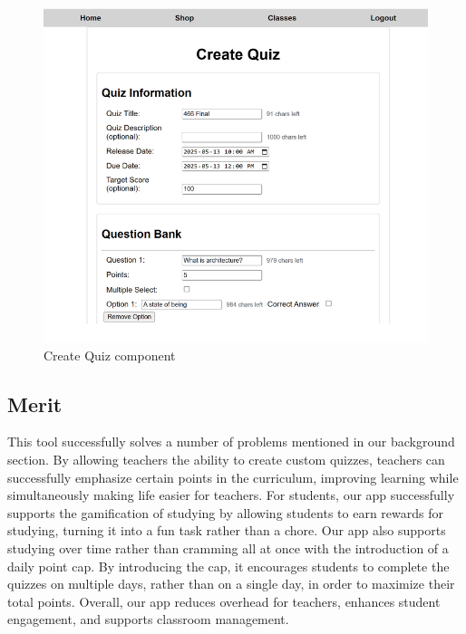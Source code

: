 \begin{enumerate}
\begin{figure}[H]
        \includegraphics[width=0.7\linewidth]{PUT INDIVIDUAL SECTIONS HERE/images/createQuiz.png}
        \caption{Create Quiz component}
        \label{create-quiz}
    \end{figure}

\end{enumerate}
\subsection{Merit}
This tool successfully solves a number of problems mentioned in our background section. By allowing teachers the ability to create custom quizzes, teachers can successfully emphasize certain points in the curriculum, improving learning while simultaneously making life easier for teachers. For students, our app successfully supports the gamification of studying by allowing students to earn rewards for studying, turning it into a fun task rather than a chore. Our app also supports studying over time rather than cramming all at once with the introduction of a daily point cap. By introducing the cap, it encourages students to complete the quizzes on multiple days, rather than on a single day, in order to maximize their total points. Overall, our app reduces overhead for teachers, enhances student engagement, and supports classroom management.
